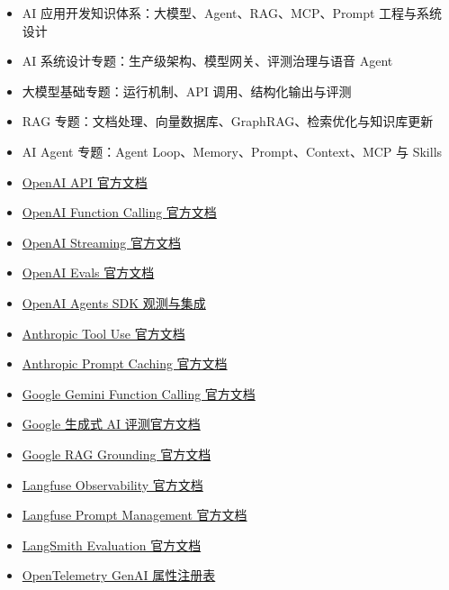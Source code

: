 \documentclass[10pt,a4paper]{ctexart}
\begin{document}
\begin{itemize}[itemsep=2pt, topsep=4pt]
  \item AI 应用开发知识体系：大模型、Agent、RAG、MCP、Prompt 工程与系统设计
  \item AI 系统设计专题：生产级架构、模型网关、评测治理与语音 Agent
  \item 大模型基础专题：运行机制、API 调用、结构化输出与评测
  \item RAG 专题：文档处理、向量数据库、GraphRAG、检索优化与知识库更新
  \item AI Agent 专题：Agent Loop、Memory、Prompt、Context、MCP 与 Skills
  \item \href{https://developers.openai.com/api/docs}{OpenAI API 官方文档}
  \item \href{https://developers.openai.com/api/docs/guides/function-calling}{OpenAI Function Calling 官方文档}
  \item \href{https://developers.openai.com/api/docs/guides/streaming-responses}{OpenAI Streaming 官方文档}
  \item \href{https://developers.openai.com/api/docs/guides/evals}{OpenAI Evals 官方文档}
  \item \href{https://developers.openai.com/api/docs/guides/agents/integrations-observability}{OpenAI Agents SDK 观测与集成}
  \item \href{https://platform.claude.com/docs/en/agents-and-tools/tool-use/overview}{Anthropic Tool Use 官方文档}
  \item \href{https://platform.claude.com/docs/en/build-with-claude/prompt-caching}{Anthropic Prompt Caching 官方文档}
  \item \href{https://docs.cloud.google.com/gemini-enterprise-agent-platform/models/tools/function-calling}{Google Gemini Function Calling 官方文档}
  \item \href{https://docs.cloud.google.com/gemini-enterprise-agent-platform/models/evaluation-overview}{Google 生成式 AI 评测官方文档}
  \item \href{https://docs.cloud.google.com/gemini-enterprise-agent-platform/models/grounding/ground-responses-using-rag}{Google RAG Grounding 官方文档}
  \item \href{https://langfuse.com/docs/observability/overview}{Langfuse Observability 官方文档}
  \item \href{https://langfuse.com/docs/prompt-management/overview}{Langfuse Prompt Management 官方文档}
  \item \href{https://docs.langchain.com/langsmith/evaluation}{LangSmith Evaluation 官方文档}
  \item \href{https://opentelemetry.io/docs/specs/semconv/registry/attributes/gen-ai/}{OpenTelemetry GenAI 属性注册表}
\end{itemize}
\end{document}
